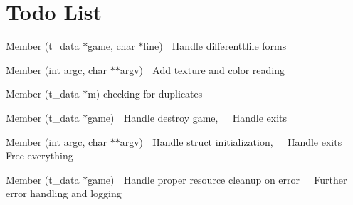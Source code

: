 \chapter{Todo List}
\hypertarget{todo}{}\label{todo}

\begin{DoxyRefList}
\item[Member \doxylink{read__file_8c_a804cd515bd4c1bf7169adeb352db80fb}{add\+\_\+line} (t\+\_\+data \texorpdfstring{$\ast$}{*}game, char \texorpdfstring{$\ast$}{*}line)]\label{todo__todo000005}%
%
👾 Handle differenttfile forms  
\item[Member \doxylink{map__helpers_8c_a9572228285cd82518fa287634356ac30}{check\+\_\+args} (int argc, char \texorpdfstring{$\ast$}{*}\texorpdfstring{$\ast$}{*}argv)]\label{todo__todo000003}%
%
👾 Add texture and color reading


\item[Member \doxylink{player__verification_8c_a3483943405fddf6f035cb64d945b9f23}{check\+\_\+player\+\_\+ns} (t\+\_\+data \texorpdfstring{$\ast$}{*}m)]\label{todo__todo000004}%
%
checking for duplicates  
\item[Member \doxylink{cub3d_8c_a935bbae1ea2cb5d18534db1274ec24dd}{exit\+\_\+point} (t\+\_\+data \texorpdfstring{$\ast$}{*}game)]\label{todo__todo000001}%
%
👾 Handle destroy game,~\newline
 👾 Handle exits  
\item[Member \doxylink{cub3d_8c_a3c04138a5bfe5d72780bb7e82a18e627}{main} (int argc, char \texorpdfstring{$\ast$}{*}\texorpdfstring{$\ast$}{*}argv)]\label{todo__todo000002}%
%
👾 Handle struct initialization,~\newline
 👾 Handle exits ~\newline
 👾 Free everything  
\item[Member \doxylink{mlx__init__create__win_8c_a81e5bd795cb879b651de99812ac575da}{mlx\+\_\+init\+\_\+create\+\_\+window} (t\+\_\+data \texorpdfstring{$\ast$}{*}game)]\label{todo__todo000006}%
%
👾 Handle proper resource cleanup on error~\newline
 👾 Further error handling and logging 
\end{DoxyRefList}